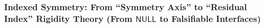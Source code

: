\subsubsection{Indexed Symmetry: From ``Symmetry Axis'' to ``Residual Index'' Rigidity Theory (From \texorpdfstring{$\mathsf{NULL}$}{NULL} to Falsifiable Interfaces)}\label{subsec:xi-certificate-coherence-orthogonal-axis-capacity}



\endinput
